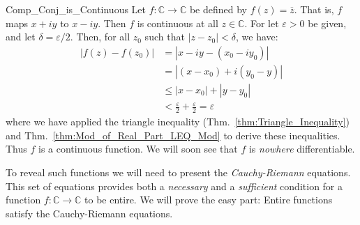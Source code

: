     \begin{lexample}{}{Comp_Conj_is_Continuous}
        Let $f:\mathbb{C}\rightarrow\mathbb{C}$ be defined by
        $f(z)=\overline{z}$. That is, $f$ maps $x+iy$ to $x-iy$.
        Then $f$ is continuous at all $z\in\mathbb{C}$. For let
        $\varepsilon>0$ be given, and let $\delta=\varepsilon/2$.
        Then, for all $z_{0}$ such that $|z-z_{0}|<\delta$, we have:
        \begin{subequations}
            \begin{align}
                |f(z)-f(z_{0})|&=|x-iy-(x_{0}-iy_{0})|\\
                               &=|(x-x_{0})+i(y_{0}-y)|\\
                               &\leq|x-x_{0}|+|y-y_{0}|\\
                               &<\frac{\varepsilon}{2}
                                +\frac{\varepsilon}{2}=\varepsilon
            \end{align}
        \end{subequations}
        where we have applied the triangle inequality
        (Thm.~\ref{thm:Triangle_Inequality}) and
        Thm.~\ref{thm:Mod_of_Real_Part_LEQ_Mod} to derive these
        inequalities. Thus $f$ is a continuous function.
        We will soon see that $f$ is \textit{nowhere} differentiable.
    \end{lexample}
    To reveal such functions we will need to present the
    \textit{Cauchy-Riemann} equations. This set of equations provides both
    a \textit{necessary} and a \textit{sufficient} condition for a
    function $f:\mathbb{C}\rightarrow\mathbb{C}$ to be entire.
    We will prove the easy part: Entire functions satisfy the
    Cauchy-Riemann equations.
    \newpage
